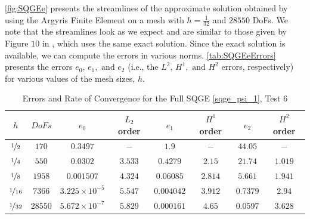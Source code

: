 \autoref{fig:SQGEe} presents the streamlines of the approximate solution obtained by using the
Argyris Finite Element on a mesh with $h=\frac{1}{32}$ and $28550$ DoFs. We note that the
streamlines look as we expect and are similar to those given by Figure $10$ in \cite{Myers}, which
uses the same exact solution. Since the exact solution is available, we can compute the errors in
various norms. \autoref{tab:SQGEeErrors} presents the errors $e_0,\, e_1, \text{ and } e_2$ (i.e.,
the $L^2,\, H^1, \text{ and } H^2$ errors, respectively) for various values of the mesh sizes, $h$.

\begin{table}%
\begin{center}
\begin{tabular}{|c|c|c|c|c|c|c|c|}%
  \hline
  $h$ & $DoFs$ & $e_0$ & $L_2$ order & $e_1$ & $H^1$ order & $e_2$ & $H^2$ order \\[0.2em] %
  \hline
  $\nicefrac{1}{2}$ & $170$ & $0.3497$ & $-$ & $1.9$ & $-$ & $44.05$ & $-$ \\[0.2em] %
  $\nicefrac{1}{4}$ & $550$ & $0.0302$ & $3.533$ & $0.4279$ & $2.15$ & $21.74$ & $1.019$ \\[0.2em] %
  $\nicefrac{1}{8}$ & $1958$ & $0.001507$ & $4.324$ & $0.06085$ & $2.814$ & $5.661$ & $1.941$ \\[0.2em] %
  $\nicefrac{1}{16}$ & $7366$ & $3.225\times 10^{-5}$ & $5.547$ & $0.004042$ & $3.912$ & $0.7379$ & $2.94$ \\[0.2em] %
  $\nicefrac{1}{32}$ & $28550$ & $5.672\times 10^{-7}$ & $5.829$ & $0.000161$ & $4.65$ & $0.0597$ & $3.628$ \\[0.2em] %
 \hline
\end{tabular}
\end{center}
\caption{Errors and Rate of Convergence for the Full SQGE \eqref{sqge_psi_1}, Test 6}
\label{tab:SQGEeErrors}
\end{table}


